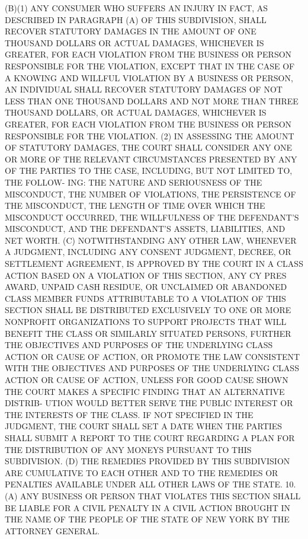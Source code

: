    (B)(1) ANY CONSUMER WHO SUFFERS AN INJURY IN  FACT,  AS  DESCRIBED  IN
 PARAGRAPH  (A)  OF  THIS SUBDIVISION, SHALL RECOVER STATUTORY DAMAGES IN
 THE AMOUNT OF ONE THOUSAND  DOLLARS  OR  ACTUAL  DAMAGES,  WHICHEVER  IS
 GREATER,  FOR EACH VIOLATION FROM THE BUSINESS OR PERSON RESPONSIBLE FOR
 THE  VIOLATION,  EXCEPT  THAT  IN  THE  CASE  OF  A  KNOWING AND WILLFUL
 VIOLATION BY A BUSINESS OR PERSON, AN INDIVIDUAL SHALL RECOVER STATUTORY
 DAMAGES OF NOT LESS THAN ONE THOUSAND DOLLARS AND NOT  MORE  THAN  THREE
 THOUSAND  DOLLARS,  OR  ACTUAL  DAMAGES,  WHICHEVER IS GREATER, FOR EACH
 VIOLATION FROM THE BUSINESS OR PERSON RESPONSIBLE FOR THE VIOLATION.
   (2) IN ASSESSING THE AMOUNT OF  STATUTORY  DAMAGES,  THE  COURT  SHALL
 CONSIDER  ANY ONE OR MORE OF THE RELEVANT CIRCUMSTANCES PRESENTED BY ANY
 OF THE PARTIES TO THE CASE, INCLUDING, BUT NOT LIMITED TO,  THE  FOLLOW-
 ING:  THE  NATURE  AND  SERIOUSNESS  OF  THE  MISCONDUCT,  THE NUMBER OF
 VIOLATIONS, THE PERSISTENCE OF THE MISCONDUCT, THE LENGTH OF  TIME  OVER
 WHICH  THE  MISCONDUCT  OCCURRED,  THE  WILLFULNESS  OF  THE DEFENDANT'S
 MISCONDUCT, AND THE DEFENDANT'S ASSETS, LIABILITIES, AND NET WORTH.
   (C) NOTWITHSTANDING ANY OTHER LAW, WHENEVER A JUDGMENT, INCLUDING  ANY
 CONSENT  JUDGMENT,  DECREE,  OR SETTLEMENT AGREEMENT, IS APPROVED BY THE
 COURT IN A CLASS ACTION BASED ON A VIOLATION OF  THIS  SECTION,  ANY  CY
 PRES  AWARD, UNPAID CASH RESIDUE, OR UNCLAIMED OR ABANDONED CLASS MEMBER
 FUNDS ATTRIBUTABLE TO A VIOLATION OF THIS SECTION SHALL  BE  DISTRIBUTED
 EXCLUSIVELY  TO  ONE OR MORE NONPROFIT ORGANIZATIONS TO SUPPORT PROJECTS
 THAT WILL BENEFIT THE CLASS OR SIMILARLY SITUATED PERSONS,  FURTHER  THE
 OBJECTIVES  AND  PURPOSES  OF  THE  UNDERLYING  CLASS ACTION OR CAUSE OF
 ACTION, OR PROMOTE THE LAW CONSISTENT WITH THE OBJECTIVES  AND  PURPOSES
 OF THE UNDERLYING CLASS ACTION OR CAUSE OF ACTION, UNLESS FOR GOOD CAUSE
 SHOWN  THE  COURT  MAKES A SPECIFIC FINDING THAT AN ALTERNATIVE DISTRIB-
 UTION WOULD BETTER SERVE THE PUBLIC INTEREST OR  THE  INTERESTS  OF  THE
 CLASS. IF NOT SPECIFIED IN THE JUDGMENT, THE COURT SHALL SET A DATE WHEN
 THE  PARTIES SHALL SUBMIT A REPORT TO THE COURT REGARDING A PLAN FOR THE
 DISTRIBUTION OF ANY MONEYS PURSUANT TO THIS SUBDIVISION.
   (D) THE REMEDIES PROVIDED BY THIS SUBDIVISION ARE CUMULATIVE  TO  EACH
 OTHER AND TO THE REMEDIES OR PENALTIES AVAILABLE UNDER ALL OTHER LAWS OF
 THE STATE.
   10.  (A)  ANY  BUSINESS  OR PERSON THAT VIOLATES THIS SECTION SHALL BE
 LIABLE FOR A CIVIL PENALTY IN A CIVIL ACTION BROUGHT IN THE NAME OF  THE
 PEOPLE OF THE STATE OF NEW YORK BY THE ATTORNEY GENERAL.
